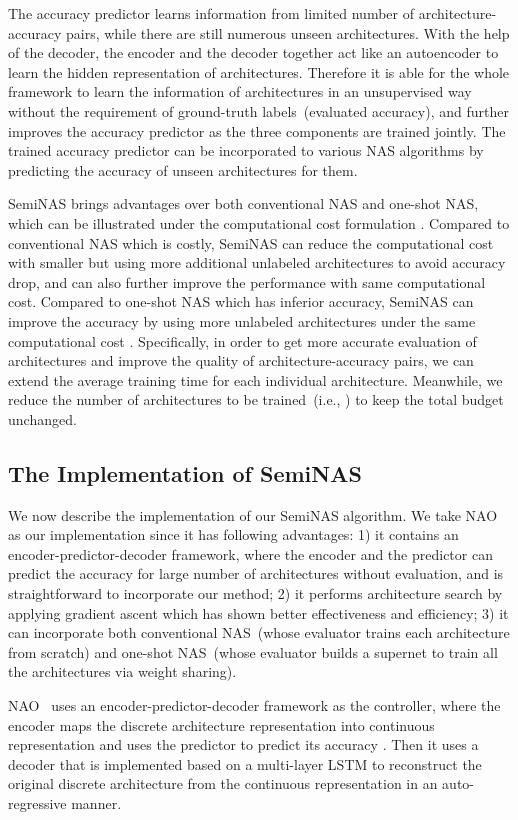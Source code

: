 \documentclass{article}
\begin{document}
The accuracy predictor learns information from limited number of architecture-accuracy pairs, while there are still numerous unseen architectures. With the help of the decoder, the encoder and the decoder together act like an autoencoder to learn the hidden representation of architectures. Therefore it is able for the whole framework to learn the information of architectures in an unsupervised way without the requirement of ground-truth labels~(evaluated accuracy), and further improves the accuracy predictor as the three components are trained jointly. The trained accuracy predictor can be incorporated to various NAS algorithms by predicting the accuracy of unseen architectures for them.

SemiNAS brings advantages over both conventional NAS and one-shot NAS, which can be illustrated under the computational cost formulation . Compared to conventional NAS which is costly, SemiNAS can reduce the computational cost  with smaller  but using more additional unlabeled architectures to avoid accuracy drop, and can also further improve the performance with same computational cost. Compared to one-shot NAS which has inferior accuracy, SemiNAS can improve the accuracy by using more unlabeled architectures under the same computational cost . Specifically, in order to get more accurate evaluation of architectures and improve the quality of architecture-accuracy pairs, we can extend the average training time  for each individual architecture. Meanwhile, we reduce the number of architectures to be trained~(i.e., ) to keep the total budget  unchanged.


\subsection{The Implementation of SemiNAS} 
\label{sec:seminas}
We now describe the implementation of our SemiNAS algorithm. We take NAO~\cite{nao} as our implementation since it has following advantages: 1) it contains an encoder-predictor-decoder framework, where the encoder and the predictor can predict the accuracy for large number of architectures without evaluation, and is straightforward to incorporate our method; 2) it performs architecture search by applying gradient ascent which has shown better effectiveness and efficiency; 3) it can incorporate both conventional NAS~(whose evaluator trains each architecture from scratch) and one-shot NAS~(whose evaluator builds a supernet to train all the architectures via weight sharing). 

NAO~\cite{nao} uses an encoder-predictor-decoder framework as the controller, where the encoder  maps the discrete architecture representation  into continuous representation  and uses the predictor  to predict its accuracy . Then it uses a decoder  that is implemented based on a multi-layer LSTM to reconstruct the original discrete architecture from the continuous representation  in an auto-regressive manner.
\end{document}

